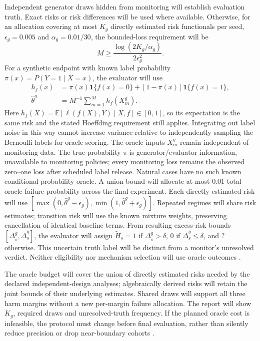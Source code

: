 \documentclass[11pt,a4paper]{article}
\newcommand{\ind}{\mathbf{1}}
\begin{document}
Independent generator draws hidden from monitoring will establish evaluation
truth. Exact risks or risk differences will be used where available. Otherwise,
for an allocation covering at most $K_g$ directly estimated risk functionals
per seed, $\epsilon_g=0.005$ and
$\alpha_g=0.01/30$, the bounded-loss requirement will be
\begin{equation}
M\geq\frac{\log(2K_g/\alpha_g)}{2\epsilon_g^2}.
\end{equation}
For a synthetic endpoint with known label probability
$\pi(x)=P(Y=1\mid X=x)$, the evaluator will use
\begin{align}
h_f(x)&=\pi(x)\ind\{f(x)=0\}+[1-\pi(x)]\ind\{f(x)=1\},\\
\widehat\theta^g&=M^{-1}\sum_{m=1}^{M}h_f(X_m^g).
\end{align}
Here $h_f(X)=\mathbb E[\ell(f(X),Y)\mid X,f]\in[0,1]$, so its expectation
is the same risk and the stated Hoeffding requirement still applies.
Integrating out label noise in this way cannot increase variance relative
to independently sampling the Bernoulli labels for oracle scoring.
The oracle inputs $X_m^g$ remain independent of monitoring data.
The true probability $\pi$ is generator/evaluator information, unavailable
to monitoring policies; every monitoring loss remains the observed
zero--one loss after scheduled label release. Natural cases have no such
known conditional-probability oracle.
A union bound will allocate at most 0.01 total oracle failure probability across
the final experiment. Each directly estimated risk will use
$[\max(0,\widehat\theta^g-\epsilon_g),
\min(1,\widehat\theta^g+\epsilon_g)]$.
Repeated regimes will share risk estimates; transition
risk will use the known mixture weights, preserving cancellation of identical
baseline terms. From resulting excess-risk bounds
$[\underline\Delta_s^g,\overline\Delta_s^g]$, the evaluator will assign
$\widetilde H_s=1$ if $\underline\Delta_s^g>\delta$, 0 if
$\overline\Delta_s^g\leq\delta$, and $?$ otherwise. This uncertain truth label
will be distinct from a monitor's unresolved verdict. Neither eligibility nor
mechanism selection will use oracle outcomes \cite{hoeffding}.

The oracle budget will cover the union of directly estimated risks needed
by the declared independent-design analyses; algebraically derived risks will
retain the joint bounds of their underlying estimates. Shared draws will support all
three harm margins without a new per-margin failure allocation. The report will
show $K_g$, required draws and unresolved-truth frequency. If the planned oracle
cost is infeasible, the protocol must change before final evaluation, rather
than silently reduce precision or drop near-boundary cohorts \cite{hoeffding}.
\end{document}
